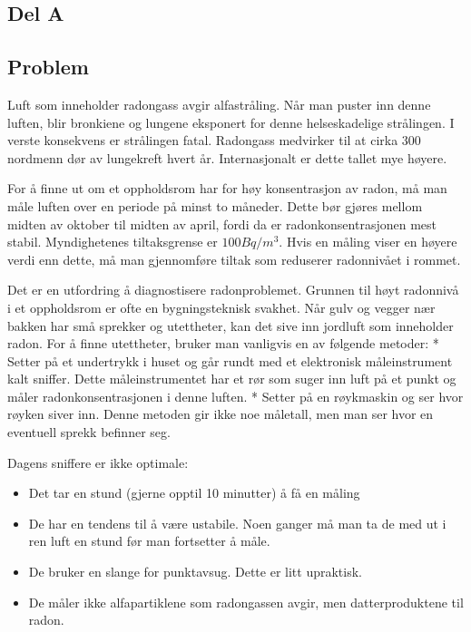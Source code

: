 \subsection{Del A}

\subsection{Problem}

Luft som inneholder radongass avgir alfastråling. Når man puster inn denne luften, blir bronkiene og lungene eksponert for denne helseskadelige strålingen. I verste konsekvens er strålingen fatal. Radongass medvirker til at cirka 300 nordmenn dør av lungekreft hvert år. Internasjonalt er dette tallet mye høyere.

For å finne ut om et oppholdsrom har for høy konsentrasjon av radon, må man måle luften over en periode på minst to måneder. Dette bør gjøres mellom midten av oktober til midten av april, fordi da er radonkonsentrasjonen mest stabil. Myndighetenes tiltaksgrense er $100 Bq/m^3$. Hvis en måling viser en høyere verdi enn dette, må man gjennomføre tiltak som reduserer radonnivået i rommet.

Det er en utfordring å diagnostisere radonproblemet. Grunnen til høyt radonnivå i et oppholdsrom er ofte en bygningsteknisk svakhet. Når gulv og vegger nær bakken har små sprekker og utettheter, kan det sive inn jordluft som inneholder radon. For å finne utettheter, bruker man vanligvis en av følgende metoder:
* Setter på et undertrykk i huset og går rundt med et elektronisk måleinstrument kalt sniffer. Dette måleinstrumentet har et rør som suger inn luft på et punkt og måler radonkonsentrasjonen i denne luften.
* Setter på en røykmaskin og ser hvor røyken siver inn. Denne metoden gir ikke noe måletall, men man ser hvor en eventuell sprekk befinner seg.

Dagens sniffere er ikke optimale:
\begin{itemize}
	\item Det tar en stund (gjerne opptil 10 minutter) å få en måling
	\item De har en tendens til å være ustabile. Noen ganger må man ta de med ut i ren luft en stund før man fortsetter å måle.
	\item De bruker en slange for punktavsug. Dette er litt upraktisk.
	\item De måler ikke alfapartiklene som radongassen avgir, men datterproduktene til radon.
\end{itemize}

